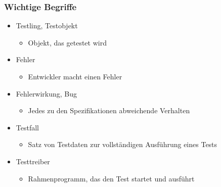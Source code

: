 \documentclass[../ZF_SWEN1.tex]{subfiles}
\begin{document}
\subsubsection{Wichtige Begriffe}
\begin{itemize}
	\item Testling, Testobjekt
	\begin{itemize}
		\item Objekt, das getestet wird
	\end{itemize}
	\item Fehler
	\begin{itemize}
		\item Entwickler macht einen Fehler
	\end{itemize}
	\item Fehlerwirkung, Bug
	\begin{itemize}
		\item Jedes zu den Spezifikationen abweichende Verhalten
	\end{itemize}
	\item Testfall
	\begin{itemize}
		\item Satz von Testdaten zur vollständigen Ausführung eines Tests
	\end{itemize}
	\item Testtreiber
	\begin{itemize}
		\item Rahmenprogramm, das den Test startet und ausführt
	\end{itemize}
\end{itemize}
\end{document}
